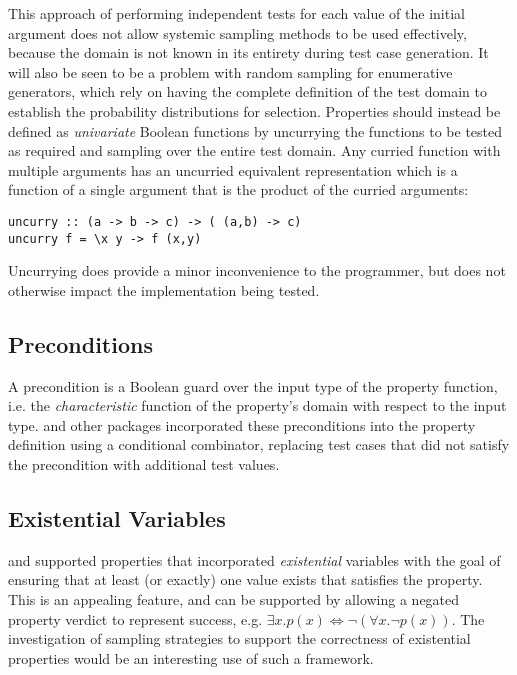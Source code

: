 This approach of performing independent tests for each value of the initial argument
does not allow systemic sampling methods to be used effectively,
because the domain is not known in its entirety during test case generation.
It will also be seen to be a problem with random sampling for enumerative generators,
which rely on having the complete definition of the test domain to
establish the probability distributions for selection.
Properties should instead be defined as \emph{univariate} Boolean functions
by uncurrying the functions to be tested as required and
sampling over the entire test domain.
Any curried function with multiple arguments has an uncurried equivalent representation
which is a function of a single argument that is the product of the curried arguments:

\begin{lstlisting}
uncurry :: (a -> b -> c) -> ( (a,b) -> c)
uncurry f = \x y -> f (x,y)

\end{lstlisting}
Uncurrying does provide a minor inconvenience to the programmer,
but does not otherwise impact the implementation being tested.

\subsection{Preconditions}
A precondition is a Boolean guard over the input type of the property function,
i.e. the \emph{characteristic} function of the property's domain with respect to the input type.
\QC and other packages incorporated these preconditions into the property definition
using a conditional combinator,
replacing test cases that did not satisfy the precondition with additional test values.

\subsection{Existential Variables}

\SC and \GAST supported properties that incorporated \emph{existential} variables
with the goal of ensuring that at least (or exactly) one value exists that satisfies the property.
This is an appealing feature,
and can be supported  by allowing a negated property verdict to represent success,
e.g. $\exists x . p (x) \iff \neg (\forall x . \neg p (x))$.
The investigation of sampling strategies to support the correctness of existential properties
would be an interesting use of such a framework.

